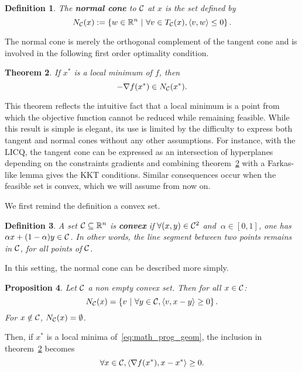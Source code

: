 \documentclass[10pt]{article}
\newtheorem{theorem}{Theorem}[]
\newtheorem{definition}[theorem]{Definition}
\newtheorem{proposition}[theorem]{Proposition}
\numberwithin{equation}{section}
\begin{document}
	\begin{definition}
		
		The \textbf{normal cone} to ${\mathcal{C}}$ at $x$ is the set defined by
		\[N_{\mathcal{C}} (x) := \left\{w \in {\mathbb{R}}^n\ | \ \forall v \in T_{\mathcal{C}}(x), \left\langle {v} , {w} \right\rangle \le 0\right\}.\]
	\end{definition}
	
	The normal cone is merely the orthogonal complement of the tangent cone and is involved in the following first order optimality condition.
	
	\begin{theorem}\label{theo:first_order_normal_cone}
		If $x^*$ is a local minimum of $f$, then \[-\nabla f(x^*) \in N_{\mathcal{C}}(x^*).\]
	\end{theorem}
	
	This theorem reflects the intuitive fact that a local minimum is a point from which the objective function cannot be reduced while remaining feasible. While this result is simple is elegant, its use is limited by the difficulty to express both tangent and normal cones without any other assumptions. For instance, with the LICQ, the tangent cone can be expressed as an intersection of hyperplanes depending on the constraints gradients and combining theorem~\ref{theo:first_order_normal_cone} with a Farkas-like lemma gives the KKT conditions. Similar consequences occur when the feasible set is convex, which we will assume from now on.
	
	We first remind the definition a convex set.
	
	\begin{definition}
		A set ${\mathcal{C}}\subseteq {\mathbb{R}}^n$ is \textbf{convex} if \(\forall (x,y) \in {\mathcal{C}}^2\) and \(\ \alpha \in [0,1] \), one has \(\alpha x+ (1-\alpha)y \in {\mathcal{C}}\).
		In other words, the line segment between two points remains in ${\mathcal{C}}$, for all points of ${\mathcal{C}}$.
	\end{definition}
	
	In this setting, the normal cone can be described more simply.
	
	\begin{proposition}\label{prop:normal_set_convex}
		Let ${\mathcal{C}} $ a non empty convex set. Then for all $x \in {\mathcal{C}}$:
		\[N_{\mathcal{C}} (x) = \left\{v \ | \ \forall y \in {\mathcal{C}}, \left\langle {v} , {x-y} \right\rangle \ge 0\right\}.\]
		For $x \notin {\mathcal{C}}$, $N_{\mathcal{C}} (x) = \emptyset$.
	\end{proposition}
	
	Then, if $x^*$ is a local minima of~\eqref{eq:math_prog_geom}, the inclusion in theorem~\ref{theo:first_order_normal_cone}  becomes
	\begin{equation}\label{eq:fo_optimality_convex_set}
		\forall x \in {\mathcal{C}}, \left\langle {\nabla f(x^*)} , {x-x^*} \right\rangle \ge 0.
	\end{equation}
	
\end{document}
